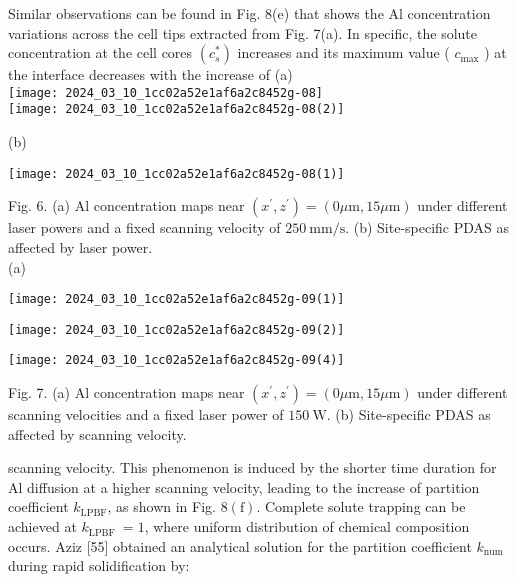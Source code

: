 \documentclass[10pt]{article}
\begin{document}
Similar observations can be found in Fig. 8(e) that shows the Al concentration variations across the cell tips extracted from Fig. 7(a). In specific, the solute concentration at the cell cores $\left(c_{s}^{*}\right)$ increases and its maximum value ( $c_{\max }$ ) at the interface decreases with the increase of (a)\\
\texttt{[image: 2024\_03\_10\_1cc02a52e1af6a2c8452g-08]}\\
\texttt{[image: 2024\_03\_10\_1cc02a52e1af6a2c8452g-08(2)]}

(b)

\begin{center}
\texttt{[image: 2024\_03\_10\_1cc02a52e1af6a2c8452g-08(1)]}
\end{center}

Fig. 6. (a) Al concentration maps near $\left(x^{\prime}, z^{\prime}\right)=(0 \mu \mathrm{m}, 15 \mu \mathrm{m})$ under different laser powers and a fixed scanning velocity of $250 \mathrm{~mm} / \mathrm{s}$. (b) Site-specific PDAS as affected by laser power.\\
(a)

\begin{center}
\texttt{[image: 2024\_03\_10\_1cc02a52e1af6a2c8452g-09(1)]}
\end{center}

\begin{center}
\texttt{[image: 2024\_03\_10\_1cc02a52e1af6a2c8452g-09(2)]}
\end{center}

\begin{center}
\texttt{[image: 2024\_03\_10\_1cc02a52e1af6a2c8452g-09(4)]}
\end{center}

Fig. 7. (a) Al concentration maps near $\left(x^{\prime}, z^{\prime}\right)=(0 \mu \mathrm{m}, 15 \mu \mathrm{m})$ under different scanning velocities and a fixed laser power of $150 \mathrm{~W}$. (b) Site-specific PDAS as affected by scanning velocity.

scanning velocity. This phenomenon is induced by the shorter time duration for Al diffusion at a higher scanning velocity, leading to the increase of partition coefficient $k_{\mathrm{LPBF}}$, as shown in Fig. $8(\mathrm{f})$. Complete solute trapping can be achieved at $k_{\text {LPBF }}=1$, where uniform distribution of chemical composition occurs. Aziz [55] obtained an analytical solution for the partition coefficient $k_{\text {num }}$ during rapid solidification by:
\end{document}
